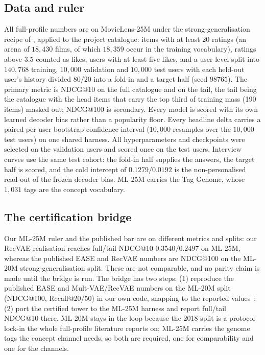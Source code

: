 \documentclass[acmsmall,review,anonymous]{acmart}
\begin{document}
\subsection{Data and ruler}
All full-profile numbers are on MovieLens-25M under the strong-generalisation recipe of \citet{liang2018variational}, applied to the project catalogue: items with at least 20 ratings (an arena of $18{,}430$ films, of which $18{,}359$ occur in the training vocabulary), ratings above $3.5$ counted as likes, users with at least five likes, and a user-level split into $140{,}768$ training, $10{,}000$ validation and $10{,}000$ test users with each held-out user's history divided $80/20$ into a fold-in and a target half (seed $98765$). The primary metric is NDCG@10 on the full catalogue and on the tail, the tail being the catalogue with the head items that carry the top third of training mass (190 items) masked out; NDCG@100 is secondary. Every model is scored with its own learned decoder bias rather than a popularity floor. Every headline delta carries a paired per-user bootstrap confidence interval ($10{,}000$ resamples over the $10{,}000$ test users) on one shared harness. All hyperparameters and checkpoints were selected on the validation users and scored once on the test users. Interview curves use the same test cohort: the fold-in half supplies the answers, the target half is scored, and the cold intercept of $0.1279/0.0192$ is the non-personalised read-out of the frozen decoder bias. ML-25M carries the Tag Genome, whose $1{,}031$ tags are the concept vocabulary.

\subsection{The certification bridge}\label{sec:bridge}
Our ML-25M ruler and the published bar are on different metrics and splits: our RecVAE realisation reaches full/tail NDCG@10 $0.3540/0.2497$ on ML-25M, whereas the published EASE and RecVAE numbers are NDCG@100 on the ML-20M strong-generalisation split. These are not comparable, and no parity claim is made until the bridge is run. The bridge has two steps: (1) reproduce the published EASE and Mult-VAE/RecVAE numbers on the ML-20M split (NDCG@100, Recall@20/50) in our own code, snapping to the reported values~\citep{steck2019ease,liang2018variational,ren2020recvae}; (2) port the certified tower to the ML-25M harness and report full/tail NDCG@10 there. ML-20M stays in the loop because the 2018 split is a protocol lock-in the whole full-profile literature reports on; ML-25M carries the genome tags the concept channel needs, so both are required, one for comparability and one for the channels.
\end{document}
